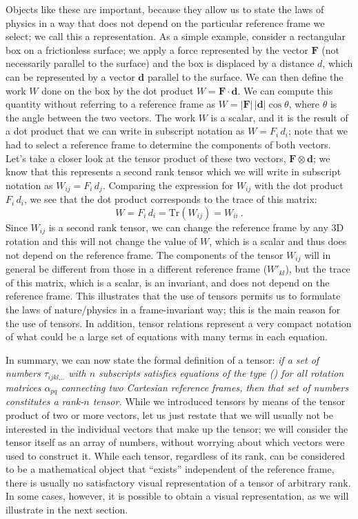 Objects like these are important, because they allow us to state the laws of physics in a way that does not depend on the particular reference frame we select; we call this a  representation.  As a simple example, consider a rectangular box on a frictionless surface; we apply a force represented by the vector $\mathbf{F}$ (not necessarily parallel to the surface) and the box is displaced by a distance $d$, which can be represented by a vector $\mathbf{d}$ parallel to the surface. We can then define the work $W$ done on the box by the dot product $W=\mathbf{F}\cdot\mathbf{d}$.  We can compute this quantity without referring to a reference frame as $W=\vert\mathbf{F}\vert\,\vert\mathbf{d}\vert\cos\theta$, where $\theta$ is the angle between the two vectors.  The work $W$ is a scalar, and it is the result of a dot product that we can write in subscript notation as $W=F_i\,d_i$; note that we had to select a reference frame to determine the components of both vectors.  Let's take a closer look at the tensor product of these two vectors, $\mathbf{F}\otimes\mathbf{d}$; we know that this represents a second rank tensor which we will write in subscript notation as $W_{ij}=F_i\,d_j$.  Comparing the expression for $W_{ij}$ with the dot product $F_i\,d_i$, we see that the dot product corresponds to the trace of this matrix:
\[
	W = F_i\,d_i = \text{Tr}(W_{ij}) = W_{ii}\ .
\]
Since $W_{ij}$ is a second rank tensor, we can change the reference frame by any 3D rotation and this will not change the value of $W$, which is a scalar and thus does not depend on the reference frame.  The components of the tensor $W_{ij}$ will in general be different from those in a different reference frame ($W'_{kl}$), but the trace of this matrix, which is a scalar, is an invariant, and does not depend on the reference frame.  This illustrates that the use of tensors permits us to formulate the laws of nature/physics in a frame-invariant way; this is the main reason for the use of tensors.  In addition, tensor relations represent a very compact notation of what could be a large set of equations with many terms in each equation.

In summary,  we can now state the formal definition of a tensor: \textit{if a set of numbers $\tau_{ijkl\ldots}$ with $n$ subscripts satisfies equations of the type () for all rotation matrices $\alpha_{pq}$ connecting two Cartesian reference frames, then that set of numbers constitutes a rank-$n$ tensor.}  While we introduced tensors by means of the tensor product of two or more vectors, let us just restate that we will usually not be interested in the individual vectors that make up the tensor; we will consider the tensor itself as an array of numbers, without worrying about which vectors were used to construct it. While each tensor, regardless of its rank, can be considered to be a mathematical object that ``exists'' independent of the reference frame, there is usually no satisfactory visual representation of a tensor of arbitrary rank.  In some cases, however, it is possible to obtain a visual representation, as we will illustrate in the next section.



